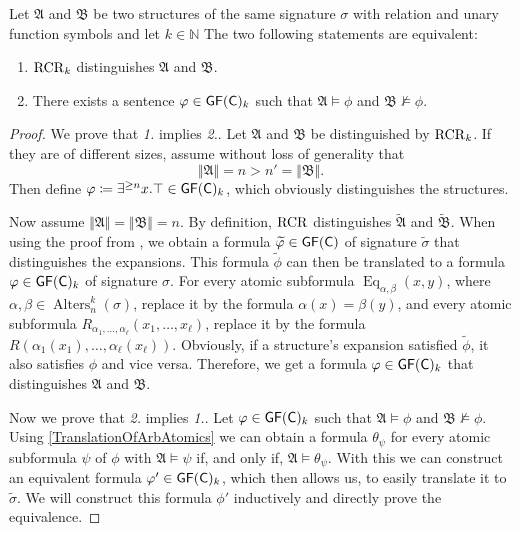 \begin{theorem}
	\label{thm:ThmB}
	Let $\mathfrak A$ and $\mathfrak B$ be two structures of the same signature $\sigma$ with relation and unary function symbols and let $k\in \mathbb{N}$
	The two following statements are equivalent:
	\begin{enumerate}
		\item $\operatorname{RCR}_k$ distinguishes $\mathfrak A$ and $\mathfrak B$.
		\item There exists a sentence $\varphi\in\mathsf{GF}(\mathsf{C})_k$ such that $\mathfrak A\models \phi$ and $\mathfrak B\not\models \phi$.
	\end{enumerate}
\end{theorem}
\begin{proof}
	We prove that \emph{1.} implies \emph{2.}. 
	Let $\mathfrak A$ and $\mathfrak B$ be distinguished by $\operatorname{RCR}_k$.
	If they are of different sizes, assume without loss of generality that 
	$$\Vert \mathfrak A \Vert =n > n'=\Vert \mathfrak B \Vert.$$
	Then define $\varphi\coloneqq \exists^{\geq n} x. \top\in \mathsf{GF}(\mathsf{C})_k$, which obviously distinguishes the structures.
	
	Now assume $\Vert \mathfrak A\Vert = \Vert \mathfrak B \Vert = n$.
	By definition, $\operatorname{RCR}$ distinguishes $\widetilde{\mathfrak A}$ and $\widetilde{\mathfrak B}$.
	When using the proof from \cite{scheidt2025ColorRefinement}, we obtain a formula $\widetilde{\varphi}\in \mathsf{GF}(\mathsf{C})$ of signature $\widetilde{\sigma}$ that distinguishes the expansions.
	This formula $\widetilde{\phi}$ can then be translated to a formula $\varphi\in\mathsf{GF}(\mathsf{C})_k$ of signature $\sigma$.
	For every atomic subformula $\operatorname{Eq}_{\alpha,\beta}(x,y)$, where $\alpha,\beta\in \operatorname{Alters}_n^k(\sigma)$, replace it by the formula $\alpha(x)=\beta(y)$,
	and every atomic subformula $R_{\alpha_1,\dots,\alpha_\ell}(x_1,\dots,x_\ell)$, replace it by the formula $R(\alpha_1(x_1),\dots,\alpha_\ell(x_\ell))$.
	Obviously, if a structure's expansion satisfied $\widetilde{\phi}$, it also satisfies $\phi$ and vice versa.
	Therefore, we get a formula $\varphi\in \mathsf{GF}(\mathsf{C})_k$ that distinguishes $\mathfrak A$ and $\mathfrak B$.
	
	Now we prove that \emph{2.} implies \emph{1.}.
	Let $\varphi\in \mathsf{GF}(\mathsf{C})_k$ such that $\mathfrak A\models \phi$ and $\mathfrak B\not\models \phi$.
	Using \cref{TranslationOfArbAtomics} we can obtain a formula $\theta_\psi$ for every atomic subformula $\psi$ of $\phi$ with $\mathfrak A\models \psi$ if, and only if, $\mathfrak A\models \theta_\psi$.
	With this we can construct an equivalent formula $\varphi'\in\mathsf{GF}(\mathsf{C})_k$, which then allows us, to easily translate it to $\widetilde{\sigma}$.
	We will construct this formula $\phi'$ inductively and directly prove the equivalence.
	

\end{proof}
